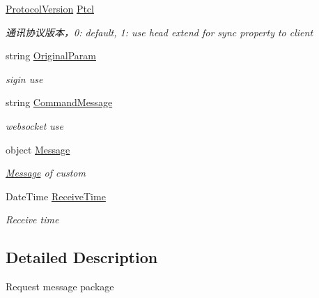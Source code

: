 \begin{DoxyCompactItemize}
\item 
\mbox{\hyperlink{namespace_t_net_1_1_service_a6651119df6dac62b849ed58cf7ece2bd}{Protocol\+Version}} \mbox{\hyperlink{class_t_net_1_1_contract_1_1_request_package_a8710751d3a15cc4b2dd93f6cdf1c9848}{Ptcl}}
\begin{DoxyCompactList}\small\item\em 通讯协议版本，0\+: default, 1\+: use head extend for sync property to client \end{DoxyCompactList}\item 
string \mbox{\hyperlink{class_t_net_1_1_contract_1_1_request_package_a959ef1d53cb6698d940dc987eac3ee12}{Original\+Param}}
\begin{DoxyCompactList}\small\item\em sigin use \end{DoxyCompactList}\item 
string \mbox{\hyperlink{class_t_net_1_1_contract_1_1_request_package_abfc3a96ff7ad81f3b18ca9faf0364b3f}{Command\+Message}}
\begin{DoxyCompactList}\small\item\em websocket use \end{DoxyCompactList}\item 
object \mbox{\hyperlink{class_t_net_1_1_contract_1_1_request_package_ab447b7612816e9a1f88cf59bbd334bb4}{Message}}
\begin{DoxyCompactList}\small\item\em \mbox{\hyperlink{namespace_t_net_1_1_message}{Message}} of custom \end{DoxyCompactList}\item 
Date\+Time \mbox{\hyperlink{class_t_net_1_1_contract_1_1_request_package_ad1884bb9a5523f6674cadaf10121ce0b}{Receive\+Time}}
\begin{DoxyCompactList}\small\item\em Receive time \end{DoxyCompactList}\end{DoxyCompactItemize}


\subsection{Detailed Description}
Request message package 



